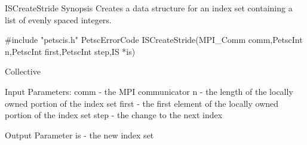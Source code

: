 ISCreateStride
Synopsis
Creates a data structure for an index set containing a list of evenly spaced integers.

#include "petscis.h"   
PetscErrorCode  ISCreateStride(MPI_Comm comm,PetscInt n,PetscInt first,PetscInt step,IS *is)

Collective

Input Parameters:
comm 	- the MPI communicator
n 	- the length of the locally owned portion of the index set
first 	- the first element of the locally owned portion of the index set
step 	- the change to the next index

Output Parameter
is - the new index set
